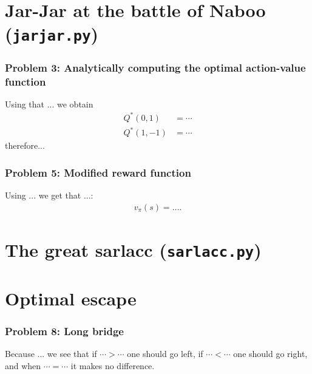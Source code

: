 \documentclass[12pt,twoside]{article}
\begin{document}
\section{Jar-Jar at the battle of Naboo (\texttt{jarjar.py})}
\subsubsection*{{\color{red}Problem 3:  Analytically computing the optimal action-value function}}
	
		Using that ... we obtain 
		\begin{align}
			Q^*(0,1) & = \cdots \\
			Q^*(1,-1) & = \cdots
		\end{align}
		therefore...
	
\subsubsection*{{\color{red}Problem 5:  Modified reward function}}
	
Using ... we get that ...:
		\begin{align}
			v_\pi(s) = \dots.
		\end{align}
	
\section{The great sarlacc (\texttt{sarlacc.py})} 
\section{Optimal escape}
\subsubsection*{{\color{red}Problem 8:  Long bridge}}
	
			Because ... we see that if $\cdots > \cdots$ one should go left, if  $\cdots < \cdots$ one should go right,
	and when $\cdots = \cdots$ it makes no difference.
		
\end{document}
